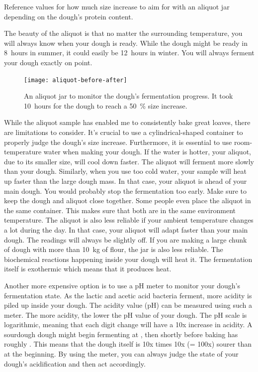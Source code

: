 \begin{table}[!htb]
    \begin{center}
        
        \caption[Increase of size versus protein content]{Reference values for
            how much size increase to aim for with an aliquot jar depending on
            the dough's protein content.}
    \end{center}
\end{table}

The beauty of the aliquot is that no matter the surrounding
temperature, you will always know when your dough is ready.
While the dough might be ready in 8~hours in summer, it could
easily be 12~hours in winter. You will always ferment your
dough exactly on point.


\begin{figure}[!htb]
  \texttt{[image: aliquot-before-after]}
  \caption[Aliquot Jar]{An aliquot jar to monitor the dough's fermentation
      progress.  It took 10~hours for the dough to reach a \qty{50}{\percent}
      size increase.}
\end{figure}

While the aliquot sample has enabled me to consistently bake
great loaves, there are limitations to consider. It's crucial
to use a cylindrical-shaped container to properly judge
the dough's size increase. Furthermore, it is essential
to use room-temperature water when making your dough. If the
water is hotter, your aliquot, due to its smaller size,
will cool down faster. The aliquot will ferment more slowly
than your dough. Similarly, when you use too cold water,
your sample will heat up faster than the large dough mass.
In that case, your aliquot is ahead of your main dough. You
would probably stop the fermentation too early. Make sure
to keep the dough and aliquot close together. Some people even
place the aliquot in the same container. This makes sure that
both are in the same environment temperature. The aliquot
is also less reliable if your ambient temperature changes
a lot during the day. In that case, your aliquot will adapt
faster than your main dough. The readings will always be slightly
off. If you are making a large chunk of dough with more
than \qty{10}{\kg} of flour, the jar is also less reliable. The biochemical
reactions happening inside your dough will heat it.
The fermentation itself is exothermic which means
that it produces heat.

Another more expensive option is to use a pH meter
to monitor your dough's fermentation state. As the lactic
and acetic acid bacteria ferment, more acidity is piled
up inside your dough. The acidity value (pH) can be
measured using such a meter. The more acidity, the lower the pH
value of your dough. The pH scale is logarithmic, meaning
that each digit change will have a 10x increase in acidity.
A sourdough dough might begin fermenting at ,
then shortly before baking has roughly . This means
that the dough itself is 10x times 10x (= 100x) sourer
than at the beginning. By using the meter, you can always
judge the state of your dough's acidification and then act
accordingly.

